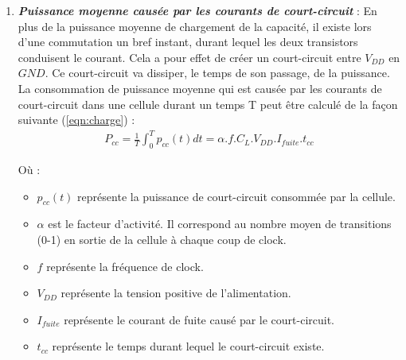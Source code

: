 \documentclass[10pt, oneside, a4paper]{article}
\begin{document}
\begin{enumerate}
\vspace{-0.2 cm}\item \textbf{\textit{Puissance moyenne causée par les courants de court-circuit}} : En plus de la puissance moyenne de chargement de la capacité, il existe lors d'une commutation un bref instant, durant lequel les deux transistors conduisent le courant. Cela a pour effet de créer un court-circuit entre $V_{DD}$ en $GND$. Ce court-circuit va dissiper, le temps de son passage, de la puissance. La consommation de puissance moyenne qui est causée par les courants de court-circuit dans une cellule durant un temps T peut être calculé de la façon suivante (\ref{eqn:charge}) :
\begin{gather}
	P_{cc} = \frac{1}{T}\int_{0}^{T}p_{cc}(t)dt=\alpha.f.C_{L}.V_{DD}.I_{fuite}.t_{cc}
\end{gather}

Où : 
\begin{itemize}
\item $p_{cc}(t)$ représente la puissance de court-circuit consommée par la cellule.
\item $\alpha$ est le facteur d'activité. Il correspond au nombre moyen de transitions (0-1) en sortie de la cellule à chaque coup de clock.
\item $f$ représente la fréquence de clock.
\item $V_{DD}$ représente la tension positive de l'alimentation.
\item $I_{fuite}$ représente le courant de fuite causé par le court-circuit.
\item $t_{cc}$ représente le temps durant lequel le court-circuit existe.
\end{itemize}

\end{enumerate}

\hspace{-0.5 cm}
\end{document}
